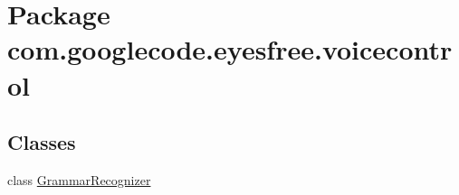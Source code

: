 \hypertarget{namespacecom_1_1googlecode_1_1eyesfree_1_1voicecontrol}{\section{Package com.\-googlecode.\-eyesfree.\-voicecontrol}
\label{namespacecom_1_1googlecode_1_1eyesfree_1_1voicecontrol}
}
\subsection*{Classes}
\begin{DoxyCompactItemize}
\item 
class \hyperlink{classcom_1_1googlecode_1_1eyesfree_1_1voicecontrol_1_1_grammar_recognizer}{Grammar\-Recognizer}
\end{DoxyCompactItemize}
